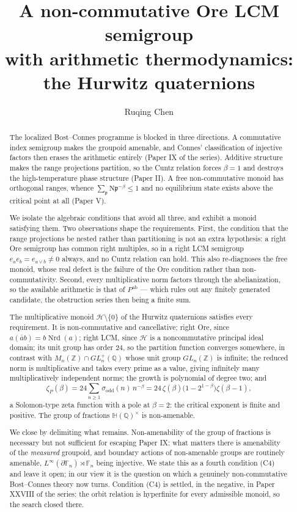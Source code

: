 \documentclass[11pt]{amsart}
\title[A non-commutative Ore LCM semigroup: the Hurwitz quaternions]{A non-commutative Ore LCM semigroup\\ with arithmetic thermodynamics:\\ the Hurwitz quaternions}
\author{Ruqing Chen}
\date{}
\numberwithin{equation}{section}
\theoremstyle{definition}
\theoremstyle{remark}
\newcommand{\Z}{\mathbb{Z}}
\newcommand{\Q}{\mathbb{Q}}
\newcommand{\F}{\mathbb{F}}
\newcommand{\HH}{\mathbb{H}}
\newcommand{\cH}{\mathcal{H}}
\newcommand{\pp}{\mathfrak{p}}
\newcommand{\Ns}{\mathrm{N}}
\newcommand{\Nrd}{\operatorname{Nrd}}
\begin{document}
\begin{abstract}
The localized Bost--Connes programme is blocked in three directions. A commutative index
semigroup makes the groupoid amenable, and Connes' classification of injective factors then
erases the arithmetic entirely (Paper IX of the series). Additive structure makes the range
projections partition, so the Cuntz relation forces $\beta=1$ and destroys the
high-temperature phase structure (Paper II). A free non-commutative monoid has orthogonal
ranges, whence $\sum_\pp\Ns\pp^{-\beta}\le1$ and no equilibrium state exists above the critical
point at all (Paper V).

We isolate the algebraic conditions that avoid all three, and exhibit a monoid satisfying
them. Two observations shape the requirements. First, the condition that the range
projections be nested rather than partitioning is not an extra hypothesis: a right Ore
semigroup has common right multiples, so in a right LCM semigroup $e_ae_b=e_{a\vee b}\ne0$
always, and no Cuntz relation can hold. This also re-diagnoses the free monoid, whose real
defect is the failure of the Ore condition rather than non-commutativity. Second, every
multiplicative norm factors through the abelianization, so the available arithmetic is that
of $P^{\mathrm{ab}}$ --- which rules out any finitely generated candidate, the obstruction
series then being a finite sum.

The multiplicative monoid $\cH\setminus\{0\}$ of the Hurwitz quaternions satisfies every
requirement. It is non-commutative and cancellative; right Ore, since
$a(\bar ab)=b\Nrd(a)$; right LCM, since $\cH$ is a noncommutative principal ideal domain; its
unit group has order $24$, so the partition function converges somewhere, in contrast with
$M_n(\Z)\cap GL_n^+(\Q)$ whose unit group $GL_n(\Z)$ is infinite; the reduced norm is
multiplicative and takes every prime as a value, giving infinitely many multiplicatively
independent norms; the growth is polynomial of degree two; and
\[
\zeta_P(\beta)=24\sum_{n\ge1}\sigma_{\mathrm{odd}}(n)\,n^{-\beta}
=24\,\zeta(\beta)\bigl(1-2^{1-\beta}\bigr)\zeta(\beta-1),
\]
a Solomon-type zeta function with a pole at $\beta=2$: the critical exponent is finite and
positive. The group of fractions $\HH(\Q)^\times$ is non-amenable.

We close by delimiting what remains. Non-amenability of the group of fractions is necessary
but not sufficient for escaping Paper IX: what matters there is amenability of the
\emph{measured} groupoid, and boundary actions of non-amenable groups are routinely amenable,
$L^\infty(\partial\F_n)\rtimes\F_n$ being injective. We state this as a fourth condition
(C4) and leave it open; in our view it is the question on which a genuinely non-commutative
Bost--Connes theory now turns.
Condition (C4) is settled, in the negative, in Paper XXVIII of the series: the orbit
relation is hyperfinite for every admissible monoid, so the search closed there.
\end{abstract}
\end{document}
